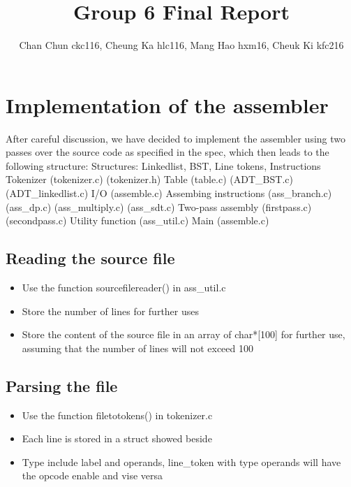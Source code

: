 \documentclass[11pt]{article}
\begin{document}
\title{Group 6 Final Report}
\author{Chan Chun ckc116, Cheung Ka hlc116, Mang Hao hxm16, Cheuk Ki kfc216}

\maketitle

\section{Implementation of the assembler}

 
After careful discussion, we have decided to implement the assembler using two passes over the source code as specified in the spec, which then leads to the following structure:\newline\newline
Structures:
Linkedlist,
BST,
Line tokens,
Instructions
\newline
Tokenizer
(tokenizer.c)
(tokenizer.h)\newline
Table
(table.c)
(ADT{\_}BST.c)
(ADT{\_}linkedlist.c)\newline
I/O
(assemble.c)\newline
Assembing instructions
(ass{\_}branch.c)
(ass{\_}dp.c)
(ass{\_}multiply.c)
(ass{\_}sdt.c)\newline
Two-pass assembly
(firstpass.c)
(secondpass.c)\newline
Utility function
(ass{\_}util.c)\newline
Main
(assemble.c)

\subsection{Reading the source file}
\begin{itemize}  
\item Use the function sourcefilereader()  in ass{\_}util.c

\item Store the number of lines for further uses 

\item Store the content of the source file in an array of char*[100] for further use, assuming that the number of lines will not exceed 100  

\end{itemize}





\subsection{Parsing the file}
\begin{itemize}  
\item Use the function filetotokens() in tokenizer.c
\item Each line is stored in a struct showed beside
\item Type include label and operands, line{\_}token with type operands will have the opcode enable and vise versa
\end{itemize}
\end{document}
